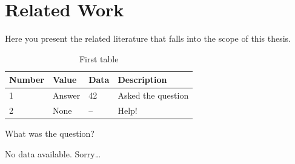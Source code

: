 \chapter{Related Work}
Here you present the related literature that falls into the scope of this thesis.

\begin{table}[!h]
	\renewcommand{\arraystretch}{1.25} %
	\vspace{.5em}
	\caption{First table}
	\label{tab:First}
	\centering
	\footnotesize
	\begin{threeparttable}[b]
		\begin{tabular}{llll}
			\toprule
			Number  & Value & Data & Description \\
			\midrule
			1 & Answer & 42 & Asked the question\tnote{1}\\
			2 & None & --\tnote{2} & Help!\\
			\bottomrule
		\end{tabular}
		\begin{tablenotes}
			\item [1] What was the question?
			\item [2] No data available. Sorry\dots
		\end{tablenotes}
	\end{threeparttable}
\end{table}